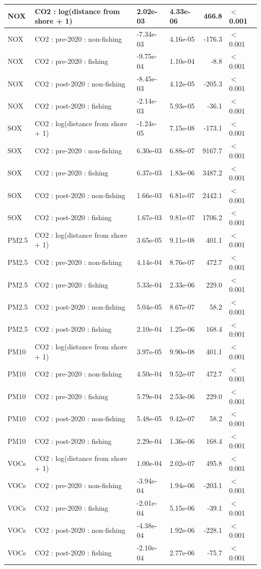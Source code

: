 \begin{table}[!h]
\begin{tabular}[t]{l|l|l|l|r|l}
\hline
NOX & CO2 : log(distance from shore + 1) & 2.02e-03 & 4.33e-06 & 466.8 & $<$0.001\\
\hline
NOX & CO2 : pre-2020 : non-fishing & -7.34e-03 & 4.16e-05 & -176.3 & $<$0.001\\
\hline
NOX & CO2 : pre-2020 : fishing & -9.75e-04 & 1.10e-04 & -8.8 & $<$0.001\\
\hline
NOX & CO2 : post-2020 : non-fishing & -8.45e-03 & 4.12e-05 & -205.3 & $<$0.001\\
\hline
NOX & CO2 : post-2020 : fishing & -2.14e-03 & 5.93e-05 & -36.1 & $<$0.001\\
\hline
SOX & CO2 : log(distance from shore + 1) & -1.24e-05 & 7.15e-08 & -173.1 & $<$0.001\\
\hline
SOX & CO2 : pre-2020 : non-fishing & 6.30e-03 & 6.88e-07 & 9167.7 & $<$0.001\\
\hline
SOX & CO2 : pre-2020 : fishing & 6.37e-03 & 1.83e-06 & 3487.2 & $<$0.001\\
\hline
SOX & CO2 : post-2020 : non-fishing & 1.66e-03 & 6.81e-07 & 2442.1 & $<$0.001\\
\hline
SOX & CO2 : post-2020 : fishing & 1.67e-03 & 9.81e-07 & 1706.2 & $<$0.001\\
\hline
PM2.5 & CO2 : log(distance from shore + 1) & 3.65e-05 & 9.11e-08 & 401.1 & $<$0.001\\
\hline
PM2.5 & CO2 : pre-2020 : non-fishing & 4.14e-04 & 8.76e-07 & 472.7 & $<$0.001\\
\hline
PM2.5 & CO2 : pre-2020 : fishing & 5.33e-04 & 2.33e-06 & 229.0 & $<$0.001\\
\hline
PM2.5 & CO2 : post-2020 : non-fishing & 5.04e-05 & 8.67e-07 & 58.2 & $<$0.001\\
\hline
PM2.5 & CO2 : post-2020 : fishing & 2.10e-04 & 1.25e-06 & 168.4 & $<$0.001\\
\hline
PM10 & CO2 : log(distance from shore + 1) & 3.97e-05 & 9.90e-08 & 401.1 & $<$0.001\\
\hline
PM10 & CO2 : pre-2020 : non-fishing & 4.50e-04 & 9.52e-07 & 472.7 & $<$0.001\\
\hline
PM10 & CO2 : pre-2020 : fishing & 5.79e-04 & 2.53e-06 & 229.0 & $<$0.001\\
\hline
PM10 & CO2 : post-2020 : non-fishing & 5.48e-05 & 9.42e-07 & 58.2 & $<$0.001\\
\hline
PM10 & CO2 : post-2020 : fishing & 2.29e-04 & 1.36e-06 & 168.4 & $<$0.001\\
\hline
VOCs & CO2 : log(distance from shore + 1) & 1.00e-04 & 2.02e-07 & 495.8 & $<$0.001\\
\hline
VOCs & CO2 : pre-2020 : non-fishing & -3.94e-04 & 1.94e-06 & -203.1 & $<$0.001\\
\hline
VOCs & CO2 : pre-2020 : fishing & -2.01e-04 & 5.15e-06 & -39.1 & $<$0.001\\
\hline
VOCs & CO2 : post-2020 : non-fishing & -4.38e-04 & 1.92e-06 & -228.1 & $<$0.001\\
\hline
VOCs & CO2 : post-2020 : fishing & -2.10e-04 & 2.77e-06 & -75.7 & $<$0.001\\
\hline
\end{tabular}
\end{table}
